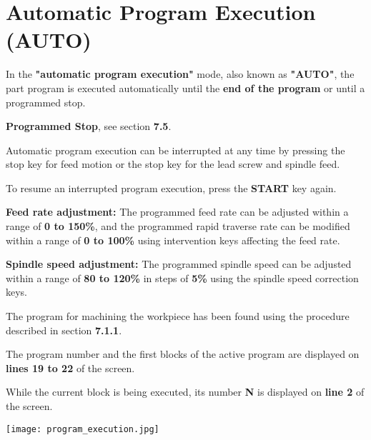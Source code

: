 \newpage

\section{Automatic Program Execution (AUTO)}

In the \textbf{"automatic program execution"} mode, also known as \textbf{"AUTO"}, the part program is executed automatically until the \textbf{end of the program} or until a programmed stop.

\textbf{Programmed Stop}, see section \textbf{7.5}.

Automatic program execution can be interrupted at any time by pressing the stop key for feed motion or the stop key for the lead screw and spindle feed.

To resume an interrupted program execution, press the \textbf{START} key again.

\textbf{Feed rate adjustment:}  
The programmed feed rate can be adjusted within a range of \textbf{0 to 150\%},  
and the programmed rapid traverse rate can be modified within a range of \textbf{0 to 100\%} using intervention keys affecting the feed rate.

\textbf{Spindle speed adjustment:}  
The programmed spindle speed can be adjusted within a range of \textbf{80 to 120\%} in steps of \textbf{5\%} using the spindle speed correction keys.

\procedure

The program for machining the workpiece has been found using the procedure described in section \textbf{7.1.1}.

\begin{itemize}
\end{itemize}

The program number and the first blocks of the active program are displayed on \textbf{lines 19 to 22} of the screen.

\begin{itemize}
\end{itemize}

While the current block is being executed, its number \textbf{N} is displayed on \textbf{line 2} of the screen.

\begin{center}
    \texttt{[image: program\_execution.jpg]}
\end{center}

